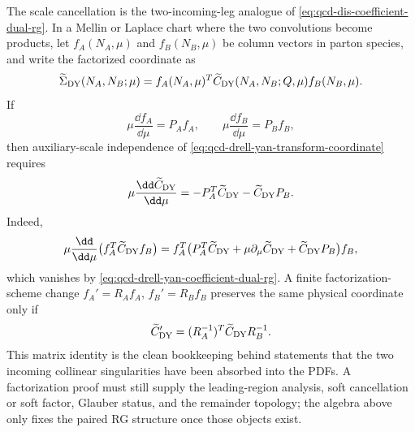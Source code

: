 The scale cancellation is the two-incoming-leg analogue of
\eqref{eq:qcd-dis-coefficient-dual-rg}.  In a Mellin or Laplace chart where the
two convolutions become products, let \(f_A(N_A,\mu)\) and \(f_B(N_B,\mu)\) be
column vectors in parton species, and write the factorized coordinate as
\begin{equation}
  \widetilde\Sigma_{\rm DY}(N_A,N_B;\mu)
  =
  f_A(N_A,\mu)^T
  \widetilde C_{\rm DY}(N_A,N_B;Q,\mu)
  f_B(N_B,\mu).
  \label{eq:qcd-drell-yan-transform-coordinate}
\end{equation}
If
\[
  \mu\frac{\dd f_A}{\dd\mu}=P_A f_A,
  \qquad
  \mu\frac{\dd f_B}{\dd\mu}=P_B f_B,
\]
then auxiliary-scale independence of
\eqref{eq:qcd-drell-yan-transform-coordinate} requires
\begin{equation}
  \mu\frac{\dd \widetilde C_{\rm DY}}{\dd\mu}
  =
  -P_A^T\widetilde C_{\rm DY}
  -\widetilde C_{\rm DY}P_B .
  \label{eq:qcd-drell-yan-coefficient-dual-rg}
\end{equation}
Indeed,
\[
  \mu\frac{\dd}{\dd\mu}
  \bigl(f_A^T\widetilde C_{\rm DY}f_B\bigr)
  =
  f_A^T
  \bigl(P_A^T\widetilde C_{\rm DY}
  +\mu\partial_\mu\widetilde C_{\rm DY}
  +\widetilde C_{\rm DY}P_B\bigr)
  f_B,
\]
which vanishes by
\eqref{eq:qcd-drell-yan-coefficient-dual-rg}.  A finite factorization-scheme
change \(f_A'=R_A f_A\), \(f_B'=R_B f_B\) preserves the same physical coordinate
only if
\[
  \widetilde C_{\rm DY}'=(R_A^{-1})^T\widetilde C_{\rm DY}R_B^{-1}.
\]
This matrix identity is the clean bookkeeping behind statements that the two
incoming collinear singularities have been absorbed into the PDFs.  A
factorization proof must still supply the leading-region analysis, soft
cancellation or soft factor, Glauber status, and the remainder topology; the
algebra above only fixes the paired RG structure once those objects exist.

